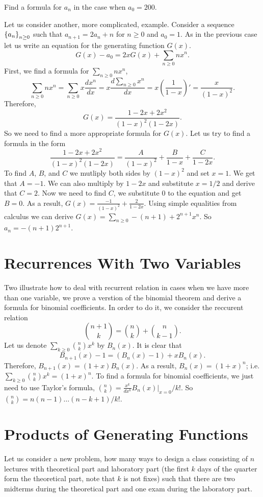 \begin{exercise}
  Find a formula for $a_n$ in the case when $a_0 = 200$.
\end{exercise}

Let us consider another, more complicated, example. Consider a sequence
$\set{a_n}_{n \ge 0}$ such that $a_{n + 1} = 2a_n + n$ for $n \ge 0$ and
$a_0 = 1$. As in the previous case let us write an equation for the
generating function $G(x)$.
\[
  G(x) - a_0 = 2xG(x) + \sum_{n \ge 0} n x^n.
\]
First, we find a formula for $\sum_{n \ge 0} n x^n$,
\[
  \sum_{n \ge 0} n x^n = \sum_{n \ge 0} x \frac{d x^n}{dx} =
  x \frac{d \sum_{n \ge 0} x^n}{dx} = x \left(\frac{1}{1 - x}\right)' =
  \frac{x}{(1 - x)^2}.
\]
Therefore,
\[
  G(x) = \frac{1 - 2x + 2x^2}{(1 - x)^2 (1 - 2x)}.
\]
So we need to find a more appropriate formula for $G(x)$.
Let us try to find a formula in the form
\[
  \frac{1 - 2x + 2x^2}{(1 - x)^2 (1 - 2x)} =
    \frac{A}{(1 - x)^2} + \frac{B}{1 - x} + \frac{C}{1 - 2x}.
\]
To find $A$, $B$, and $C$ we mutliply both sides by $(1 - x)^2$ and set $x = 1$.
We get that $A = -1$. We can also multiply by $1 - 2x$ and substitute
$x = 1 / 2$ and derive that $C = 2$. Now we need to find $C$, we substitute $0$
to the equation and get $B = 0$. As a result,
$G(x) = \frac{-1}{(1 - x)^2} + \frac{2}{1 - 2x}$. Using simple equalities from
calculus we can derive $G(x) = \sum_{n \ge 0} -(n + 1) + 2^{n + 1} x^n$.
So $a_n = -(n + 1) 2^{n + 1}$.

\section{Recurrences With Two Variables}
Two illustrate how to deal with recurrent relation in cases when we have
more than one variable, we prove a verstion of the binomial theorem and
derive a formula for binomial coefficients. In order to do it,
we consider the reccurent relation
\[
  \binom{n + 1}{k} = \binom{n}{k} + \binom{n}{k - 1}.
\]
Let us denote $\sum_{k \ge 0} \binom{n}{k} x^k$ by $B_n(x)$.
It is clear that
\[
  B_{n + 1}(x) - 1 = (B_n(x) - 1) + x B_n(x).
\]
Therefore, $B_{n + 1}(x) = (1 + x) B_n(x)$. As a result, $B_n(x) = (1 + x)^n$;
i.e. $\sum_{k \ge 0} \binom{n}{k} x^k = (1 + x)^n$. To find a
formula for binomial coefficients, we just need to use Taylor's formula,
$\binom{n}{k} = \frac{x^k}{dx^k} B_n(x)\big\rvert_{x = 0}  / k!$. So
$\binom{n}{k} = n (n - 1) \dots (n - k + 1) / k!$.

\section{Products of Generating Functions}
Let us consider a new problem, how many ways to design a class consisting of
$n$ lectures with theoretical part and laboratory part (the first $k$ days of
the quarter form the theoretical part, note that $k$ is not fixes) such that
there are two midterms during the theoretical part and one exam during the
laboratory part.

